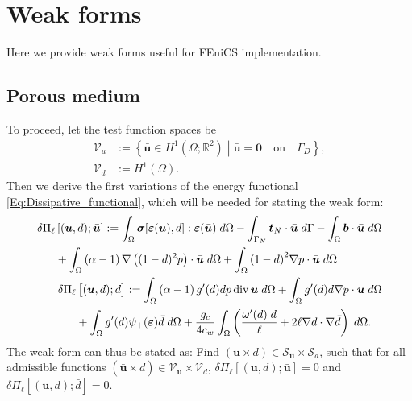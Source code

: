 \section{Weak forms }\label{sub:weak_form}
Here we provide weak forms useful for FEniCS implementation.

\subsection{Porous medium} \label{sub:weak_porous}
To proceed, let the test function spaces be
\begin{equation*}
    \begin{aligned}
        \mathscr{V}_u &:= \left\{\bar{\bm{u}}\in H^1\left(\Omega; \mathbb{R}^2\right) \middle|
        \bar{\bm{u}} = \mathbf{0} \quad \text{on} \quad\Gamma_D
        \right\},\\
        \mathscr{V}_d &:= H^1(\Omega).
    \end{aligned}
\end{equation*}
Then we derive the first variations of the energy functional \eqref{Eq:Dissipative_functional}, which will be needed for stating the weak form:
\begin{subequations} \label{Eq:Residual}
    \begin{align}
	    \begin{split}
	    \label{Eq:Residual_u}\delta \Pi_\ell & \left[(\bm{u}, d); \bar{\bm{u}} \right]
	    := \int_\Omega \bm{\sigma}[\bm{\varepsilon}(\bm{u}), d] : \bm{\varepsilon}(\bar{\bm{u}}) \;d\Omega - \int_{\Gamma_N} \bm{t}_N\cdot \bar{\bm{u}} \; d\Gamma - \int_\Omega \bm{b} \cdot\bar{\bm{u}}\; d\Omega \\
	    &+\int_{\Omega} \left(\alpha-1\right) \nabla \left((1-d)^2  {p}\right) \cdot \bar{\bm{u}} \; d\Omega + \int_{\Omega}  {\left(1 - d\right)}^2\nabla {p}\cdot \bar{\bm{u}}  \; d\Omega
	    \end{split}\\
	    \begin{split}
	     \label{Eq:Residual_d}\delta \Pi_\ell & \left[(\bm{u}, d);  \bar{d} \right]
	    	    := \int_{\Omega} \left(\alpha-1\right)g'(d)\bar{d} {p} \operatorname{div}{\bm{u}} \; d\Omega +	\int_{\Omega} g'(d)\bar{d}   \nabla {p} \cdot {\bm{u}} \; d\Omega 
        \\
	    & + \int_\Omega g'(d) \psi_+(\bm{\varepsilon}) \bar{d}  \; d\Omega +
	    \frac{g_c}{4c_w} \int_\Omega  \left(\frac{\omega'(d)\;\bar{d}}{\ell} + 2\ell \nabla d\cdot\nabla \bar{d} \right)\;d\Omega.
	    \end{split}
	\end{align}
\end{subequations}
The weak form can thus be stated as: Find $\left(\bm{u}\times d \right)\in\mathscr{S}_{\bm{u}}\times\mathscr{S}_d$, such that for all admissible functions $\left(\bar{\bm{u}}\times\bar{d} \right)\in\mathscr{V}_{\bm{u}}\times\mathscr{V}_d$, $\delta\Pi_\ell\left[(\bm{u},d); \bar{\bm{u}}\right]=0$ and $\delta\Pi_\ell\left[(\bm{u},d); \bar{d}\right]=0$.


